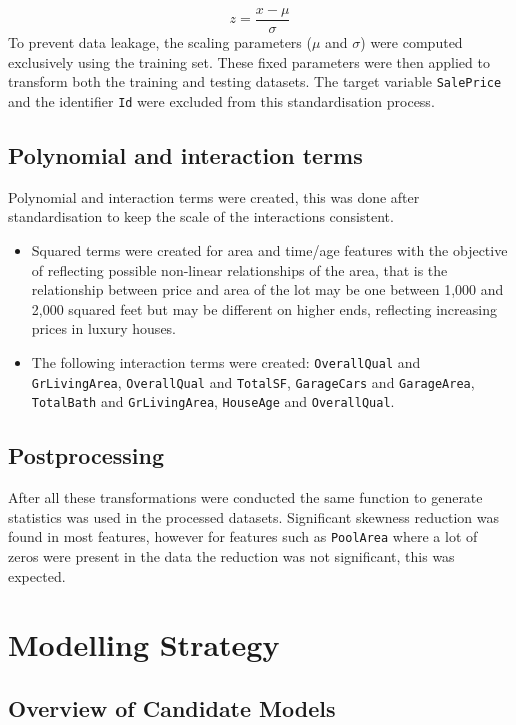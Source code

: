 \documentclass[12pt,oneside]{article} %
\begin{document}
\[
    z = \frac{x - \mu}{\sigma}
\]
\noindent
To prevent data leakage, the scaling parameters ($\mu$ and $\sigma$) were computed exclusively using the training set. These fixed parameters were then applied to transform both the training and testing datasets. The target variable \texttt{SalePrice} and the identifier \texttt{Id} were excluded from this standardisation process.

\subsection{Polynomial and interaction terms}
Polynomial and interaction terms were created, this was done after standardisation to keep the scale of the interactions consistent.
\begin{itemize}
    \item Squared terms were created for area and time/age features with the objective of reflecting possible non-linear relationships of the area, that is the relationship between price and area of the lot may be one between 1,000 and 2,000 squared feet but may be different on higher ends, reflecting increasing prices in luxury houses.
    \item The following interaction terms were created: \texttt{OverallQual} and \texttt{GrLivingArea}, \texttt{OverallQual} and \texttt{TotalSF}, \texttt{GarageCars} and \texttt{GarageArea}, \texttt{TotalBath} and \texttt{GrLivingArea}, \texttt{HouseAge} and \texttt{OverallQual}.
\end{itemize}

\subsection{Postprocessing}
After all these transformations were conducted the same function to generate statistics was used in the processed datasets. Significant skewness reduction was found in most features, however for features such as \texttt{PoolArea} where a lot of zeros were present in the data the reduction was not significant, this was expected.

\section{Modelling Strategy}
\subsection{Overview of Candidate Models}
\end{document}
